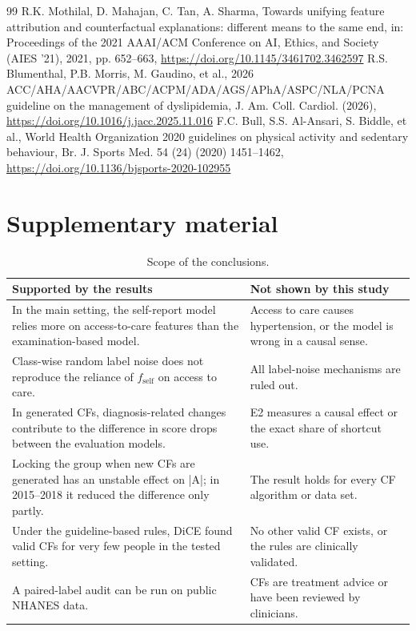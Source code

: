 \documentclass[final,5p,times,twocolumn]{elsarticle}
\begin{document}
\begin{thebibliography}{99}
 R.K. Mothilal, D. Mahajan, C. Tan, A. Sharma, Towards unifying feature attribution and counterfactual explanations: different means to the same end, in: Proceedings of the 2021 AAAI/\allowbreak{}ACM Conference on AI, Ethics, and Society (AIES '21), 2021, pp. 652–663, \url{https://doi.org/10.1145/3461702.3462597}
 R.S. Blumenthal, P.B. Morris, M. Gaudino, et al., 2026 ACC/\allowbreak{}AHA/\allowbreak{}AACVPR/\allowbreak{}ABC/\allowbreak{}ACPM/\allowbreak{}ADA/\allowbreak{}AGS/\allowbreak{}APhA/\allowbreak{}ASPC/\allowbreak{}NLA/\allowbreak{}PCNA guideline on the management of dyslipidemia, J. Am. Coll. Cardiol. (2026), \url{https://doi.org/10.1016/j.jacc.2025.11.016}
 F.C. Bull, S.S. Al-Ansari, S. Biddle, et al., World Health Organization 2020 guidelines on physical activity and sedentary behaviour, Br. J. Sports Med. 54 (24) (2020) 1451–1462, \url{https://doi.org/10.1136/bjsports-2020-102955}
\end{thebibliography}
\clearpage
\appendix
\setcounter{table}{0}\setcounter{figure}{0}
\section{Supplementary material}

\begin{table}[!htbp]
\caption{Scope of the conclusions.}
\label{tabA1}
\footnotesize{}\selectfont\renewcommand{\arraystretch}{1.1}
\begin{tabularx}{\textwidth}{>{\raggedright\arraybackslash}X>{\raggedright\arraybackslash}X}
\toprule
\textbf{Supported by the results} & \textbf{Not shown by this study} \\ \midrule
In the main setting, the self-report model relies more on access-to-care features than the examination-based model. & Access to care causes hypertension, or the model is wrong in a causal sense. \\
Class-wise random label noise does not reproduce the reliance of $f_{\mathrm{self}}$ on access to care. & All label-noise mechanisms are ruled out. \\
In generated CFs, diagnosis-related changes contribute to the difference in score drops between the evaluation models. & E2 measures a causal effect or the exact share of shortcut use. \\
Locking the group when new CFs are generated has an unstable effect on |A|; in 2015–2018 it reduced the difference only partly. & The result holds for every CF algorithm or data set. \\
Under the guideline-based rules, DiCE found valid CFs for very few people in the tested setting. & No other valid CF exists, or the rules are clinically validated. \\
A paired-label audit can be run on public NHANES data. & CFs are treatment advice or have been reviewed by clinicians. \\
\bottomrule
\end{tabularx}
\end{table}
\end{document}
